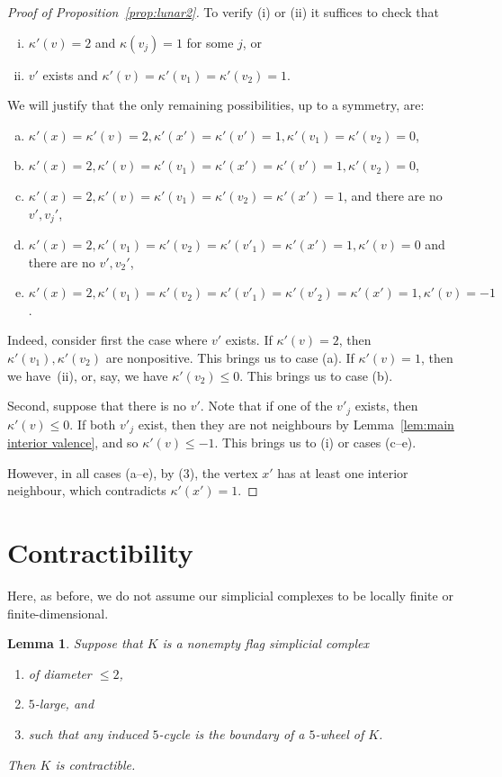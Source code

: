 \documentclass[a4paper,12pt,leqno]{amsart}
\newtheorem{lemma}[thm]{Lemma}
\theoremstyle{definition}
\begin{document}
\begin{proof}[Proof of Proposition~\ref{prop:lunar2}]
To verify (i) or (ii) it suffices to check that 
\begin{enumerate}[(i)]
\item $\kappa'(v)=2$ and $\kappa(v_j)=1$ for some $j$, or
\item $v'$ exists and $\kappa'(v)=\kappa'(v_1)=\kappa'(v_2)=1$.
\end{enumerate}

We will justify that the only remaining possibilities, up to a symmetry, are:

\begin{enumerate}[(a)]
\item $\kappa'(x)=\kappa'(v)=2,\kappa'(x')=\kappa'(v')=1, \kappa'(v_1)=\kappa'(v_2)=0$, \item $\kappa'(x)=2, \kappa'(v)=\kappa'(v_1)=\kappa'(x')=\kappa'(v')=1, \kappa'(v_2)=0$, 
\item $\kappa'(x)=2, \kappa'(v)=\kappa'(v_1)=\kappa'(v_2)=\kappa'(x')=1$, and there are no $v',v_j'$, 
\item $\kappa'(x)=2,\kappa'(v_1)=\kappa'(v_2)=\kappa'(v'_1)=\kappa'(x')=1,\kappa'(v)=0$ and there are no $v',v_2'$,
\item $\kappa'(x)=2, \kappa'(v_1)=\kappa'(v_2)=\kappa'(v'_1)=\kappa'(v'_2)=\kappa'(x')=1, \kappa'(v)=-1$.
\end{enumerate}

Indeed, consider first the case where $v'$ exists. If $\kappa'(v)=2$, then $\kappa'(v_1),\kappa'(v_2)$ are nonpositive. This brings us to case (a). If $\kappa'(v)=1$, then we have~(ii), or, say, we have $\kappa'(v_2)\leq 0$. This brings us to case (b).

Second, suppose that there is no $v'$. Note that if one of the $v'_j$ exists, then $\kappa'(v)\leq 0$. If both $v'_j$ exist, then they are not neighbours by Lemma~\ref{lem:main interior valence}, and so $\kappa'(v)\leq -1$. This brings us to (i) or cases (c--e). 

However, in all cases (a--e), by (3), the vertex $x'$ has at least one interior neighbour, which contradicts $\kappa'(x')=1$.
\end{proof}


\section{Contractibility}

Here, as before, we do not assume our simplicial complexes to be locally finite or finite-dimensional. 

\begin{lemma} \label{lem:small balls are contractible}
    Suppose that $K$ is a nonempty flag simplicial complex 
    \begin{enumerate}
        \item of diameter $\leq 2$,
        \item $5$-large, and 
        \item such that any induced $5$-cycle is the boundary of a $5$-wheel of $K$.
    \end{enumerate}
    Then $K$ is contractible.
\end{lemma}
\end{document}
